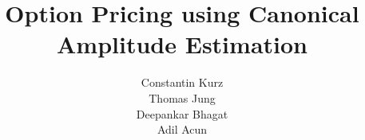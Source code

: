 \documentclass[a4paper, 12pt, one column]{article}
\title{Option Pricing using Canonical Amplitude Estimation}
\author{Constantin Kurz \\ Thomas Jung \\ Deepankar Bhagat \\ Adil Acun}
\def\biblio{}
\begin{document}
\def\biblio{}
\maketitle













\end{document}
